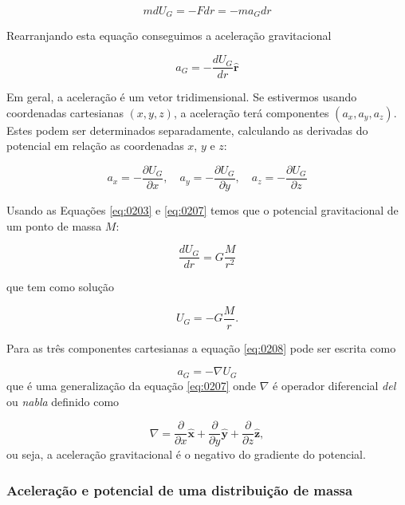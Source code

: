 \documentclass[]{book}
\theoremstyle{definition}
\theoremstyle{definition}
\theoremstyle{definition}
\theoremstyle{remark}
\begin{document}
\begin{equation}
mdU_G = -Fdr = -ma_Gdr \label{eq:0206}
\end{equation}

Rearranjando esta equação conseguimos a aceleração gravitacional

\begin{equation}
a_G = -\frac{dU_G}{dr} \hat{\mathbf{r}} \label{eq:0207}
\end{equation}

Em geral, a aceleração é um vetor tridimensional. Se estivermos usando coordenadas cartesianas \((x, y, z)\), a aceleração terá componentes \((a_x, a_y, a_z)\). Estes podem ser determinados separadamente, calculando as derivadas do potencial em relação as coordenadas \(x\), \(y\) e \(z\):

\begin{equation}
a_x = -\frac{\partial U_G}{\partial x}, \quad a_y = -\frac{\partial U_G}{\partial y},\quad a_z = -\frac{\partial U_G}{\partial z} \label{eq:0208}
\end{equation}

Usando as Equações \eqref{eq:0203} e \eqref{eq:0207} temos que o potencial gravitacional de um ponto de massa \(M\):

\begin{equation}
\frac{dU_G}{dr} = G\frac{M}{r^2}
\label{eq:0209}
\end{equation}

que tem como solução

\begin{equation}
U_G = -G\frac{M}{r}.
\label{eq:0210}
\end{equation}

Para as três componentes cartesianas a equação \eqref{eq:0208} pode ser escrita como

\[a_G = -\nabla U_G \]
que é uma generalização da equação \eqref{eq:0207} onde \(\nabla\) é operador diferencial \emph{del} ou \emph{nabla} definido como

\[ \nabla=\frac{\partial}{\partial x}\hat{\mathbf{x}} + \frac{\partial}{\partial y}\hat{\mathbf{y}} + \frac{\partial}{\partial z}\hat{\mathbf{z}},\]
ou seja, a aceleração gravitacional é o negativo do gradiente do potencial.

\hypertarget{aceleracao-e-potencial-de-uma-distribuicao-de-massa}{%
\subsubsection{Aceleração e potencial de uma distribuição de massa}\label{aceleracao-e-potencial-de-uma-distribuicao-de-massa}}
\end{document}
